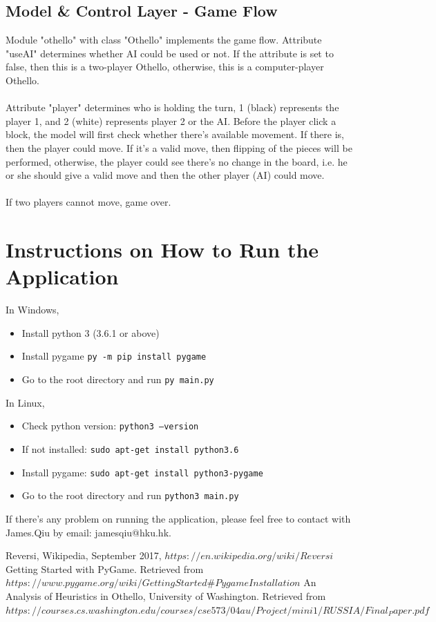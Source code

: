 \documentclass[letterpaper,12pt]{article}
\begin{document}
\subsection{Model \& Control Layer - Game Flow}
Module "othello" with class "Othello" implements the game flow. Attribute "useAI" determines whether AI could be used or not. If the attribute is set to false, then this is a two-player Othello, otherwise, this is a computer-player Othello.\\\\
\noindent
Attribute "player" determines who is holding the turn, 1 (black) represents the player 1, and 2 (white) represents player 2 or the AI. Before the player click a block, the model will first check whether there's available movement. If there is, then the player could move. If it's a valid move, then flipping of the pieces will be performed, otherwise, the player could see there's no change in the board, i.e. he or she should give a valid move and then the other player (AI) could move.\\\\
\noindent
If two players cannot move, game over.

\section{Instructions on How to Run the Application}

In Windows,

\begin{itemize}
\item Install python 3 (3.6.1 or above)
\item Install pygame \texttt{py -m pip install pygame}
\item Go to the root directory and run \texttt{py main.py}
\end{itemize}

\noindent
In Linux,

\begin{itemize}
\item Check python version: \texttt{python3 --version}
\item If not installed: \texttt{sudo apt-get install python3.6}
\item Install pygame: \texttt{sudo apt-get install python3-pygame}
\item Go to the root directory and run \texttt{python3 main.py}
\end{itemize}

\noindent
If there's any problem on running the application, please feel free to contact with James.Qiu by email: jamesqiu@hku.hk.


\begin{thebibliography}{}
\bibitem{}
Reversi, Wikipedia, September 2017, $https://en.wikipedia.org/wiki/Reversi$
\bibitem{}
Getting Started with PyGame. Retrieved from \\$https://www.pygame.org/wiki/GettingStarted\#Pygame Installation$
\bibitem{}
An Analysis of Heuristics in Othello, University of Washington. Retrieved from \\$https://courses.cs.washington.edu/courses/cse573/04au/Project/mini1/RUSSIA/Final_Paper.pdf$
\end{thebibliography}
\end{document}
